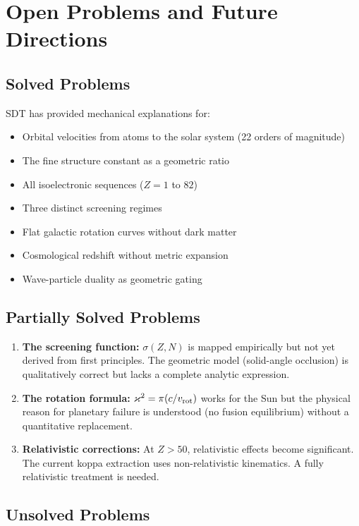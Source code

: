 \chapter{Open Problems and Future Directions}
\label{ch:open-problems}


\section{Solved Problems}

SDT has provided mechanical explanations for:
\begin{itemize}
  \item Orbital velocities from atoms to the solar system (22 orders of magnitude)
  \item The fine structure constant as a geometric ratio
  \item All isoelectronic sequences ($Z = 1$ to $82$)
  \item Three distinct screening regimes
  \item Flat galactic rotation curves without dark matter
  \item Cosmological redshift without metric expansion
  \item Wave-particle duality as geometric gating
\end{itemize}


\section{Partially Solved Problems}

\begin{enumerate}
  \item \textbf{The screening function:} $\sigma(Z,N)$ is mapped empirically but not yet derived from first principles. The geometric model (solid-angle occlusion) is qualitatively correct but lacks a complete analytic expression.
  \item \textbf{The rotation formula:} $\varkappa^2 = \pi(c/v_{\text{rot}})$ works for the Sun but the physical reason for planetary failure is understood (no fusion equilibrium) without a quantitative replacement.
  \item \textbf{Relativistic corrections:} At $Z > 50$, relativistic effects become significant. The current koppa extraction uses non-relativistic kinematics. A fully relativistic treatment is needed.
\end{enumerate}


\section{Unsolved Problems}

